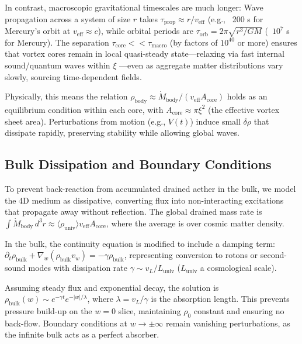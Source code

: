 \documentclass{article}
\begin{document}
In contrast, macroscopic gravitational timescales are much longer: Wave propagation across a system of size $r$ takes $\tau_{\text{prop}} \approx r / v_{\text{eff}}$ (e.g., ~200 s for Mercury's orbit at $v_{\text{eff}} \approx c$), while orbital periods are $\tau_{\text{orb}} = 2\pi \sqrt{r^3 / G M}$ (~$10^{7}$ s for Mercury). The separation $\tau_{\text{core}} << \tau_{\text{macro}}$ (by factors of $10^{40}$ or more) ensures that vortex cores remain in local quasi-steady state---relaxing via fast internal sound/quantum waves within $\xi$ ---even as aggregate matter distributions vary slowly, sourcing time-dependent fields.

Physically, this means the relation $\rho_{\text{body}} \approx \dot{M}_{\text{body}} / (v_{\text{eff}} A_{\text{core}})$ holds as an equilibrium condition within each core, with $A_{\text{core}} \approx \pi \xi^2$ (the effective vortex sheet area). Perturbations from motion (e.g., $V(t)$) induce small $\delta \rho$ that dissipate rapidly, preserving stability while allowing global waves.

\subsection{Bulk Dissipation and Boundary Conditions}

To prevent back-reaction from accumulated drained aether in the bulk, we model the 4D medium as dissipative, converting flux into non-interacting excitations that propagate away without reflection. The global drained mass rate is $\int \dot{M}_{\text{body}} \, d^3 r \approx \langle \rho_{\text{univ}} \rangle v_{\text{eff}} A_{\text{core}}$, where the average is over cosmic matter density.

In the bulk, the continuity equation is modified to include a damping term: $\partial_t \rho_{\text{bulk}} + \nabla_w (\rho_{\text{bulk}} v_w) = -\gamma \rho_{\text{bulk}}$, representing conversion to rotons or second-sound modes with dissipation rate $\gamma \sim v_L / L_{\text{univ}}$ ($L_{\text{univ}}$ a cosmological scale).

Assuming steady flux and exponential decay, the solution is $\rho_{\text{bulk}}(w) \sim e^{-\gamma t} e^{-|w| / \lambda}$, where $\lambda = v_L / \gamma$ is the absorption length. This prevents pressure build-up on the $w=0$ slice, maintaining $\rho_0$ constant and ensuring no back-flow. Boundary conditions at $w \to \pm \infty$ remain vanishing perturbations, as the infinite bulk acts as a perfect absorber.
\end{document}
